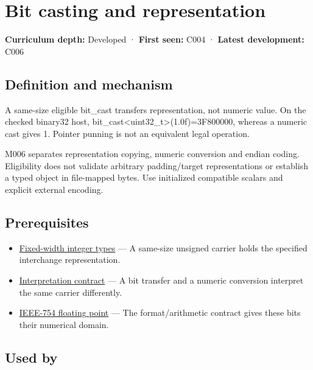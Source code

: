 \hypertarget{appendix-34ee45f161c1}{}\label{referencestart:appendix-34ee45f161c1}
\section{Bit casting and representation}\label{appendix-34ee45f161c1-bit-casting-and-representation}

\textbf{Curriculum depth:} Developed · \textbf{First seen:} C004 · \textbf{Latest development:} C006

\subsection{Definition and mechanism}\label{appendix-34ee45f161c1-definition-and-mechanism}

A same-size eligible bit\_cast transfers representation, not numeric value. On the checked binary32 host, bit\_cast\textless uint32\_t\textgreater{}(1.0f)=3F800000, whereas a numeric cast gives 1. Pointer punning is not an equivalent legal operation.

M006 separates representation copying, numeric conversion and endian coding. Eligibility does not validate arbitrary padding/target representations or establish a typed object in file-mapped bytes. Use initialized compatible scalars and explicit external encoding.

\subsection{Prerequisites}\label{appendix-34ee45f161c1-prerequisites}

\begin{itemize}
\tightlist
\item
  \hyperref[appendix-cc04044b5782]{Fixed-width integer types} --- A same-size unsigned carrier holds the specified interchange representation.
\item
  \hyperref[appendix-f414bd4ed05c]{Interpretation contract} --- A bit transfer and a numeric conversion interpret the same carrier differently.
\item
  \hyperref[appendix-343615f49ddf]{IEEE-754 floating point} --- The format/arithmetic contract gives these bits their numerical domain.
\end{itemize}

\subsection{Used by}\label{appendix-34ee45f161c1-used-by}

